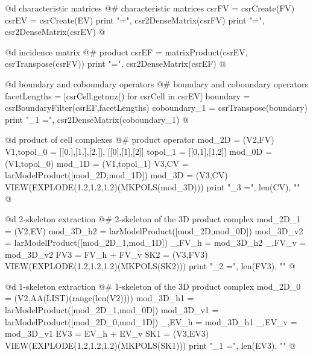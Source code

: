 \documentclass[11pt,oneside]{article}	%
\begin{document}
@d characteristic matrices
@{# characteristic matrices
csrFV = csrCreate(FV)
csrEV = csrCreate(EV)
print "\nFV =\n", csr2DenseMatrix(csrFV)
print "\nEV =\n", csr2DenseMatrix(csrEV)
@}

@d incidence matrix
@{# product
csrEF = matrixProduct(csrEV, csrTranspose(csrFV))
print "\nEF =\n", csr2DenseMatrix(csrEF)
@}

@d boundary and coboundary operators
@{# boundary and coboundary operators
facetLengths = [csrCell.getnnz() for csrCell in csrEV]
boundary = csrBoundaryFilter(csrEF,facetLengths)
coboundary_1 = csrTranspose(boundary)
print "\ncoboundary_1 =\n", csr2DenseMatrix(coboundary_1)
@}

@d product of cell complexes
@{# product operator
mod_2D = (V2,FV)
V1,topol_0 = [[0.],[1.],[2.]], [[0],[1],[2]]
topol_1 = [[0,1],[1,2]]
mod_0D = (V1,topol_0)
mod_1D = (V1,topol_1)
V3,CV = larModelProduct([mod_2D,mod_1D])
mod_3D = (V3,CV)
VIEW(EXPLODE(1.2,1.2,1.2)(MKPOLS(mod_3D)))
print "\nk_3 =", len(CV), "\n"
@}

@d 2-skeleton extraction
@{# 2-skeleton of the 3D product complex
mod_2D_1 = (V2,EV)
mod_3D_h2 = larModelProduct([mod_2D,mod_0D])
mod_3D_v2 = larModelProduct([mod_2D_1,mod_1D])
_,FV_h = mod_3D_h2
_,FV_v = mod_3D_v2
FV3 = FV_h + FV_v
SK2 = (V3,FV3)
VIEW(EXPLODE(1.2,1.2,1.2)(MKPOLS(SK2)))
print "\nk_2 =", len(FV3), "\n"
@}

@d 1-skeleton extraction 
@{# 1-skeleton of the 3D product complex 
mod_2D_0 = (V2,AA(LIST)(range(len(V2))))
mod_3D_h1 = larModelProduct([mod_2D_1,mod_0D])
mod_3D_v1 = larModelProduct([mod_2D_0,mod_1D])
_,EV_h = mod_3D_h1
_,EV_v = mod_3D_v1
EV3 = EV_h + EV_v
SK1 = (V3,EV3)
VIEW(EXPLODE(1.2,1.2,1.2)(MKPOLS(SK1)))
print "\nk_1 =", len(EV3), "\n"
@}
\end{document}
